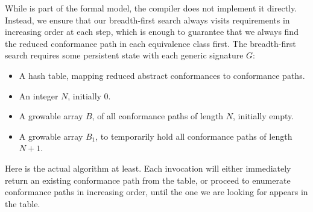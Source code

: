 \documentclass[../generics]{subfiles}
\begin{document}
While  is part of the formal model, the compiler does not implement it directly. Instead, we ensure that our breadth-first search always visits requirements in increasing order at each step, which is enough to guarantee that we always find the reduced conformance path in each equivalence class first. The breadth-first search requires some persistent state with each generic signature $G$:
\begin{itemize}
\item A hash table, mapping reduced abstract conformances to conformance paths.
\item An integer $N$, initially 0.
\item A growable array $B$, of all conformance paths of length $N$, initially empty.
\item A growable array $B_1$, to temporarily hold all conformance paths of length $N+1$.
\end{itemize}

Here is the actual algorithm at least. Each invocation will either immediately return an existing conformance path from the table, or proceed to enumerate conformance paths in increasing order, until the one we are looking for appears in the table.
\end{document}
